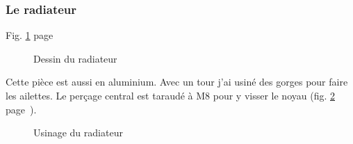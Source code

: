 \subsubsection{Le radiateur}%
\noindent Fig. \ref{sch_radiateur} page~\pageref{sch_radiateur} \par %
\begin{figure}%
   \caption{\label{sch_radiateur} Dessin du radiateur}%
\end{figure}%
Cette pièce est aussi en aluminium. Avec un tour j'ai usiné des gorges pour faire les ailettes. %
Le perçage central est taraudé à M8 pour y visser le noyau (fig. \ref{usinage_radiateur} %
page~\pageref{usinage_radiateur}).%
\begin{figure}%
   \caption{\label{usinage_radiateur} Usinage du radiateur}%
\end{figure}%
